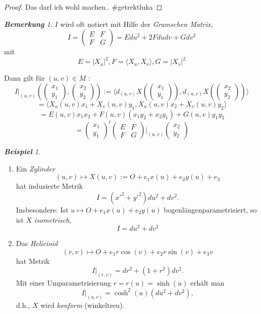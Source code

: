 \documentclass[a4paper,oneside,11pt,DIV=12,parskip=half]{scrartcl}
\theoremstyle{plain}
\theoremstyle{definition}
\newtheorem{remark, definition}[theorem]{Bemerkung und Definition.}
\newtheorem{lemma, definition}[theorem]{Lemma und Definition.}
\theoremstyle{remark}
\newtheorem*{remark}{\textbf{Bemerkung}}
\newtheorem*{example}{\textbf{Beispiel}}
\newtheorem*{remark, example}{\textbf{Bemerkung und Beispiel}}
\begin{document}
\begin{proof}
	Das darf ich wohl machen.. \#getrektluka
\end{proof}

\begin{remark}
	
	$I$ wird oft notiert mit Hilfe der \emph{Gramschen Matrix}, \[ I = \begin{pmatrix}
	E & F\\
	F & G
	\end{pmatrix} = E du^2 + 2Fdudv + Gdv^2 \] mit
	\[ E=|X_u|^2, F = \langle X_u,X_v \rangle, G = |X_v|^2  \]
	


Dann gilt für $ (u,v) \in M$ : \[ I \big|_{(u,v)}(\begin{pmatrix}
x_1 \\
y_1
\end{pmatrix},\begin{pmatrix}
x_2 \\
y_2
\end{pmatrix}) := \langle d_{(u,v)}X(\begin{pmatrix}
x_1 \\
y_1
\end{pmatrix}),  d_{(u,v)}X(\begin{pmatrix}
x_2 \\
y_2
\end{pmatrix})  \rangle \] \[= \langle X_u(u,v)x_1 + X_v(u,v)y_1, X_u(u,v)x_2 + X_v(u,v)y_2 \rangle \]
\[ = E(u,v)x_1x_2 + F(u,v)(x_1y_2 + x_2y_1) + G(u,v)y_1y_2 \]
\[ = \begin{pmatrix}
x_1 \\
y_1
\end{pmatrix}^t \begin{pmatrix}
E & F \\ 
F & G
\end{pmatrix}\Bigg|_{(u,v)} \begin{pmatrix}
x_2\\
y_2
\end{pmatrix} \]

\end{remark}

\begin{example}
	
	\begin{enumerate}
		
		\item Ein \emph{Zylinder} $$ (u,v) \mapsto X(u,v) := O + e_1x(u) + e_2y(u) +e_3 $$
		hat induzierte Metrik \[ I = (x'^2 + y'^2)du^2 + dv^2. \]
		Insbesondere: Ist $ u \mapsto O+e_1x(u) + e_2y(u) $ bogenlängenparametrisiert, so ist $ X $ \emph{isometrisch},
		\[I = du^2 + dv^2\]
		
		\item Das \emph{Helicioid} \[ (r,v) \mapsto O + e_1r\cos(v)+e_2r\sin(v) + e_3v \]
		hat Metrik \[ I\big|_{(r,v)}=dr^2 + (1+r^2)dv^2. \]
		Mit einer Umparametrisierung $r = r(u) = \sinh(u)$ erhält man \[ I \big|_{(u,v)}= \cosh^2(u)(du^2+dv^2), \] d.h., $X$ wird \emph{konform} (winkeltreu).
		
	\end{enumerate}
	
\end{example}
\end{document}
